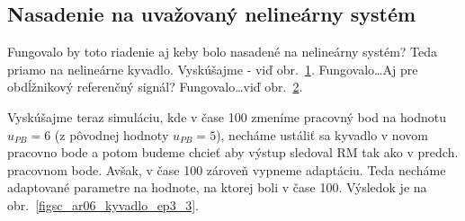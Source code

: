 \documentclass[a4paper, 10pt, ]{article}
\begin{document}
\subsection{Nasadenie na uvažovaný nelineárny systém}


Fungovalo by toto riadenie aj keby bolo nasadené na nelineárny systém? Teda priamo na nelineárne kyvadlo. Vyskúšajme - viď obr.~\ref{figsc_ar06_kyvadlo_ep3_1}. Fungovalo\ldots Aj pre obdĺžnikový referenčný signál? Fungovalo\ldots viď obr.~\ref{figsc_ar06_kyvadlo_ep3_2}.




\begin{figure}[!b]
	\centering

    \vspace{-3mm}


    \vspace{-2mm}

	\caption{}
	\label{figsc_ar06_kyvadlo_ep3_1}


    \vspace{-2mm}

\end{figure}










\begin{figure}[!t]
	\centering

    \vspace{-3mm}


    \vspace{-2mm}

	\caption{}
	\label{figsc_ar06_kyvadlo_ep3_2}


    \vspace{-2mm}

\end{figure}






Vyskúšajme teraz simuláciu, kde v čase 100 zmeníme pracovný bod na hodnotu $u_{PB} = 6$ (z pôvodnej hodnoty $u_{PB} = 5$), necháme ustáliť sa kyvadlo v novom pracovno bode a potom budeme chcieť aby výstup sledoval RM tak ako v predch. pracovnom bode. Avšak, v čase 100 zároveň vypneme adaptáciu. Teda necháme adaptované parametre na hodnote, na ktorej boli v čase 100. Výsledok je na obr.~\ref{figsc_ar06_kyvadlo_ep3_3}.
\end{document}
